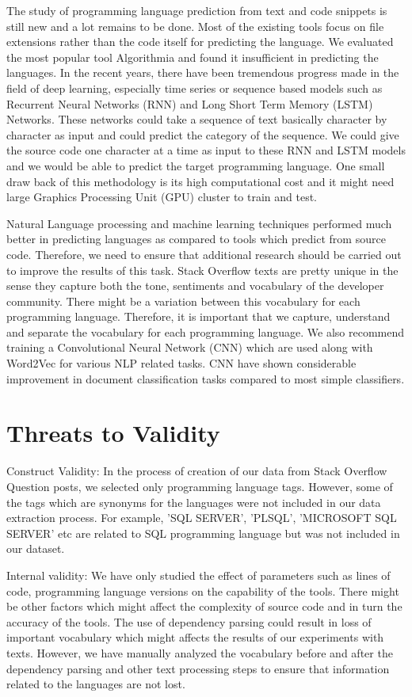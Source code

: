 \documentclass[letterpaper, 10 pt, conference]{ieeeconf}  %
\begin{document}
The study of programming language prediction from text and code snippets is still new and a lot remains to be done. Most of the existing tools focus on file extensions rather than the code itself for predicting the language. We evaluated the most popular tool Algorithmia and found it insufficient in predicting the languages. In the recent years, there have been tremendous progress made in the field of deep learning, especially time series or sequence based models such as Recurrent Neural Networks (RNN) and Long Short Term Memory (LSTM) Networks. These networks could take a sequence of text basically character by character as input and could predict the category of the sequence. We could give the source code one character at a time as input to these RNN and LSTM models and we would be able to predict the target programming language. One small draw back of this methodology is its high computational cost and it might need large Graphics Processing Unit (GPU) cluster to train and test.
 
Natural Language processing and machine learning techniques performed much better in predicting languages as compared to tools which predict from source code. Therefore, we need to ensure that additional research should be carried out to improve the results of this task. Stack Overflow texts are pretty unique in the sense they capture both the tone, sentiments and vocabulary of the developer community. There might be a variation between this vocabulary for each programming language. Therefore, it is important that we capture, understand and separate the vocabulary for each programming language. We also recommend training a Convolutional Neural Network (CNN) which are used along with Word2Vec for various NLP related tasks. CNN have shown considerable improvement in document classification tasks compared to most simple classifiers.


\section{Threats to Validity}

Construct Validity: 
In the process of creation of our data from Stack Overflow Question posts, we selected only programming language tags. However, some of the tags which are synonyms for the languages were not included in our data extraction process. For example, 'SQL SERVER', 'PLSQL', 'MICROSOFT SQL SERVER' etc are related to SQL programming language but was not included in our dataset. 

Internal validity:
We have only studied the effect of parameters such as lines of code, programming language versions on the capability of the tools. There might be other factors  which might affect the complexity of source code and in turn the accuracy of the tools. The use of dependency parsing could result in loss of important vocabulary which might affects the results of our experiments with texts. However, we have manually analyzed the vocabulary before and after the dependency parsing and other text processing steps to ensure that information related to the languages are not lost.
 
\end{document}
